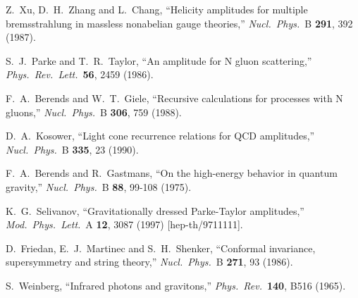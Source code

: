 \documentclass[12pt]{livrev}
\begin{document}
\begin{thebibliography}{99}
Z.~Xu, D.~H.~Zhang and L.~Chang,
``Helicity amplitudes for multiple bremsstrahlung in massless nonabelian 
gauge theories,''
{\it Nucl.\ Phys.}\ B {\bf 291}, 392 (1987).

S.~J.~Parke and T.~R.~Taylor,
``An amplitude for N gluon scattering,''
{\it Phys.\ Rev.\ Lett.}\  {\bf 56}, 2459 (1986).

F.~A.~Berends and W.~T.~Giele,
``Recursive calculations for processes with N gluons,''
{\it Nucl.\ Phys.}\ B {\bf 306}, 759 (1988).

D.~A.~Kosower,
``Light cone recurrence relations for QCD amplitudes,''
{\it Nucl.\ Phys.}\ B {\bf 335}, 23 (1990).

F.~A.~Berends and R.~Gastmans,
``On the high-energy behavior in quantum gravity,''
{\it Nucl.\ Phys.}\ B {\bf 88}, 99-108 (1975).

K.~G.~Selivanov,
``Gravitationally dressed Parke-Taylor amplitudes,''
{\it Mod.\ Phys.\ Lett.}\ A {\bf 12}, 3087 (1997)
[hep-th/9711111].

D.~Friedan, E.~J.~Martinec and S.~H.~Shenker,
``Conformal invariance, supersymmetry and string theory,''
{\it Nucl.\ Phys.}\ B {\bf 271}, 93 (1986).

S.~Weinberg,
``Infrared photons and gravitons,''
{\it Phys.\ Rev.}\  {\bf 140}, B516 (1965).


\end{thebibliography}
\end{document}
